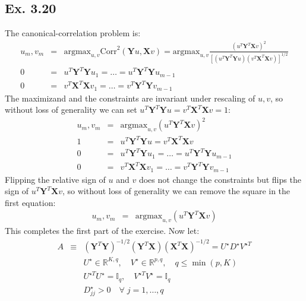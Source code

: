 \subsection*{Ex. 3.20}
The canonical-correlation problem is:
\begin{eqnarray*}
u_m, v_m & = & \textrm{argmax}_{u, v} \textrm{Corr}^2 \left( \mathbf{Y} u, \mathbf{X} v \right)
 =  \textrm{argmax}_{u, v} \frac{\left( u ^T \mathbf{Y}^T \mathbf{X} v \right)^2}{ \left[ \left( u^T \mathbf{Y}^T \mathbf{Y} u  \right) \left( v^T \mathbf{X}^T \mathbf{X} v \right) \right] ^{1/2}}\\
0 & = & u^T \mathbf{Y}^T \mathbf{Y} u_1 = \ldots = u ^T \mathbf{Y}^T \mathbf{Y} u_{m - 1} \\
0 & = & v^T \mathbf{X}^T \mathbf{X} v_1 = \ldots = v^T \mathbf{Y}^T \mathbf{Y} v_{m - 1}
\end{eqnarray*}
The maximizand and the constraints are invariant under rescaling of $u, v$, so without loss of generality we can set $u ^T \mathbf{Y}^T \mathbf{Y} u = v^T \mathbf{X}^T \mathbf{X} v = 1$:
\begin{eqnarray*}
 u_m, v_m & = & \textrm{argmax}_{u, v} \left( u ^T \mathbf{Y}^T \mathbf{X} v \right)^2 \\
 1 & = &u ^T \mathbf{Y}^T \mathbf{Y} u = v^T \mathbf{X}^T \mathbf{X} v \\
 0 & = & u^T \mathbf{Y}^T \mathbf{Y} u_1 = \ldots = u ^T \mathbf{Y}^T \mathbf{Y} u_{m - 1} \\
 0 & = & v^T \mathbf{X}^T \mathbf{X} v_1 = \ldots = v^T \mathbf{Y}^T \mathbf{Y} v_{m - 1}
\end{eqnarray*}
Flipping the relative sign of $u$ and $v$ does not change the constraints but
flips the sign of $u ^T \mathbf{Y}^T \mathbf{X} v$, so without loss of generality
we can remove the square in the first equation:
\begin{eqnarray*}
u_m, v_m & = & \textrm{argmax}_{u, v} \left( u ^T \mathbf{Y}^T \mathbf{X} v \right)
\end{eqnarray*}
This completes the first part of the exercise. Now let:
\begin{eqnarray*}
A & \equiv & \left( \mathbf{Y}^T \mathbf{Y} \right)^{-1/2} \left( \mathbf{Y}^T \mathbf{X} \right) \left( \mathbf{X} ^T \mathbf{X} \right)^{-1/2} = U ^{\star} D ^{\star} V^{\star T}\\
&& U ^{\star} \in \mathbb{R}^{K, q}, \quad V ^{\star} \in \mathbb{R}^{p, q}, \quad q \leq \min{(p, K)}\\
&&U ^{\star T} U ^{\star} = \mathbb{I}_q, \quad V ^{\star T} V ^{\star} = \mathbb{I}_q\\
&& D ^{\star}_{jj} > 0\quad \forall\; j = 1, \ldots, q
\end{eqnarray*}
